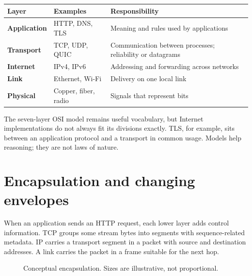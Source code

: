 \begin{center}
\begin{tabularx}{\textwidth}{@{}>{\bfseries}p{30mm} p{32mm} X@{}}
\toprule
Layer & Examples & Responsibility \\
\midrule
Application & HTTP, DNS, TLS & Meaning and rules used by applications \\
Transport & TCP, UDP, QUIC & Communication between processes; reliability or datagrams \\
Internet & IPv4, IPv6 & Addressing and forwarding across networks \\
Link & Ethernet, Wi-Fi & Delivery on one local link \\
Physical & Copper, fiber, radio & Signals that represent bits \\
\bottomrule
\end{tabularx}
\end{center}

The seven-layer OSI model remains useful vocabulary, but Internet implementations
do not always fit its divisions exactly. TLS, for example, sits between an
application protocol and a transport in common usage. Models help reasoning;
they are not laws of nature.

\section{Encapsulation and changing envelopes}

When an application sends an HTTP request, each lower layer adds control
information. TCP groups some stream bytes into segments with sequence-related
metadata. IP carries a transport segment in a packet with source and destination
addresses. A link carries the packet in a frame suitable for the next hop.

\begin{figure}[htbp]
\centering
{}
\caption{Conceptual encapsulation. Sizes are illustrative, not proportional.}
\label{fig:encapsulation}
\end{figure}

